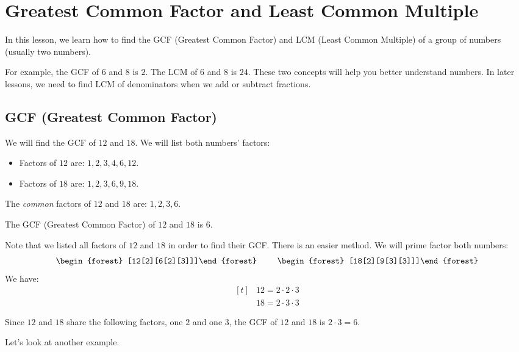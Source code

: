 \section{Greatest Common Factor and Least Common Multiple}

In this lesson, we learn how to find the GCF (Greatest Common Factor) and LCM (Least Common Multiple) of a group of numbers (usually two numbers).

For example, the GCF of $6$ and $8$ is $2$. The LCM of $6$ and $8$ is $24$. These two concepts will help you better understand numbers. In later lessons, we need to find LCM of denominators when we add or subtract fractions.

\subsection{GCF (Greatest Common Factor)}
We will find the GCF of $12$ and $18$. We will list both numbers' factors:

\begin{itemize}
\item Factors of $12$ are: $1,2,3,4,6,12$.
\item Factors of $18$ are: $1,2,3,6,9,18$.
\end{itemize}

The \textit{common} factors of $12$ and $18$ are: $1,2,3,6$.

The GCF (Greatest Common Factor) of $12$ and $18$ is $6$.

Note that we listed all factors of $12$ and $18$ in order to find their GCF. There is an easier method. We will prime factor both numbers:
\[
\begin{tabular}{ l c r }
  \begin{forest} [12[2][6[2][3]]]\end{forest} &  & \begin{forest} [18[2][9[3][3]]]\end{forest} \\
\end{tabular}
\]
We have:
\[
\begin{aligned}[t]
&12=2\cdot2\cdot3 \\
&18=2\cdot3\cdot3
\end{aligned}
\]

Since $12$ and $18$ share the following factors, one $2$ and one $3$, the GCF of $12$ and $18$ is $2\cdot3=6$.

Let's look at another example.

